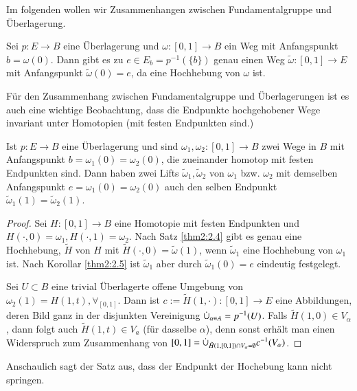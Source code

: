 \documentclass[a4paper,10pt]{scrartcl}
\begin{document}
Im folgenden wollen wir Zusammenhangen zwischen Fundamentalgruppe und Überlagerung.
\begin{kor} \label{thm2:2.5}
 Sei $p:E\to B$ eine Überlagerung und $\omega:[0,1]\to B$ ein Weg mit Anfangspunkt $b=\omega(0)$. Dann gibt es zu $e\in E_b=p^{-1}(\{b\})$ genau einen Weg $\tilde \omega: [0,1] \to E$ mit Anfangspunkt $\tilde \omega(0)=e$, da eine Hochhebung von $\omega$ ist.
\end{kor}
Für den Zusammenhang zwischen Fundamentalgruppe und Überlagerungen ist es auch eine wichtige Beobachtung, dass die Endpunkte hochgehobener Wege invariant unter Homotopien (mit festen Endpunkten sind.) 
\begin{kor}\label{thm2:2.6}
 Ist $p: E\to B$ eine Überlagerung und sind $ \omega_1, \omega_2: [0,1]\to B$ zwei Wege in $B$ mit Anfangspunkt $b=\omega_1(0)=\omega_2(0)$, 
die zueinander homotop mit festen Endpunkten sind.  Dann haben zwei Lifts $\tilde \omega_1, \tilde \omega_2$ von $\omega_1$ bzw.  $\omega_2$ mit demselben Anfangspunkt $e=\omega_1(0)=\omega_2(0)$ auch den selben Endpunkt $\tilde \omega_1(1)=\tilde \omega_2(1)$.
\end{kor}
\begin{proof}
 Sei $H: [0,1] \to B$ eine Homotopie mit festen Endpunkten und $H(\cdot, 0)=\omega_1, H(\cdot, 1)=\omega_2 $. Nach Satz \ref{thm2:2.4} gibt es genau eine Hochhebung, $\tilde H$ von $H$ mit $\tilde H(\cdot, 0)=\tilde \omega(1)$, wenn $\tilde \omega_1$ eine Hochhebung von $\omega_1$ ist. 
Nach Korollar \ref{thm2:2.5} ist $\tilde \omega_1$ aber durch $\tilde \omega_1(0)=e$ eindeutig festgelegt.

Sei $U\subset B$ eine trivial Überlagerte offene Umgebung von $\omega_2(1)=H(1,t), \forall_[0,1]$. Dann ist $c:= \tilde H(1, \cdot): [0,1]\to E$ eine Abbildungen, deren Bild ganz in der disjunkten Vereinigung $\mathbin{\dot{\cup}}_{\alpha\in A}=p^{-1}(U)$. 
Falls $\tilde H(1,0)\in V_\alpha$, dann folgt auch $\tilde H(1,t) \in V_a$ (für dasselbe $\alpha$), denn sonst erhält man einen Widerspruch zum Zusammenhang von $[0,1]=\mathbin{\dot{\cup}}_{\tilde H(1,[0,1])\cap V_\alpha=\emptyset} c^{-1}(V_\alpha)$.
\end{proof}
Anschaulich sagt der Satz aus, dass der Endpunkt der Hochebung kann nicht springen.
\end{document}
